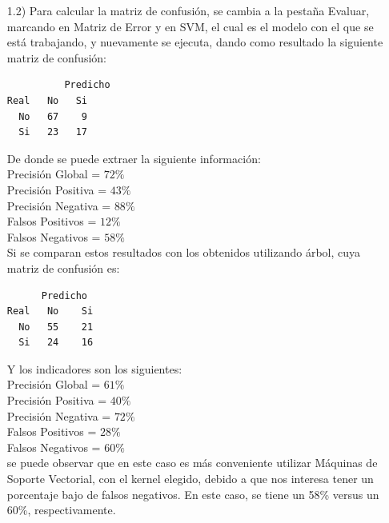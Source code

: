 \documentclass[11pt,a4paper]{report}
\begin{document}
\begin{itemize}
\item[1.2)] Para calcular la matriz de confusión, se cambia a la pestaña Evaluar, marcando en Matriz de Error y en SVM, el cual es el modelo con el que se está trabajando, y nuevamente se ejecuta, dando como resultado la siguiente matriz de confusión:
\begin{verbatim}
	      Predicho
Real   No 	Si
  No   67 	 9
  Si   23 	17
\end{verbatim}
De donde se puede extraer la siguiente información:\\
Precisión Global = $72\%$\\
Precisión Positiva = $43\%$\\
Precisión Negativa = $88\%$\\
Falsos Positivos = $12\%$\\
Falsos Negativos = $58\%$\\

Si se comparan estos resultados con los obtenidos utilizando árbol, cuya matriz de confusión es:
\begin{verbatim}
      Predicho
Real   No 	 Si
  No   55	 21
  Si   24 	 16
\end{verbatim}
Y los indicadores son los siguientes:\\
Precisión Global = $61\%$\\
Precisión Positiva = $40\%$\\
Precisión Negativa = $72\%$\\
Falsos Positivos = $28\%$\\
Falsos Negativos = $60\%$\\

se puede observar que en este caso es más conveniente utilizar Máquinas de Soporte Vectorial, con el kernel elegido, debido a que nos interesa tener un porcentaje bajo de falsos negativos. En este caso, se tiene un 58\% versus un 60\%, respectivamente.


\end{itemize}
\end{document}
